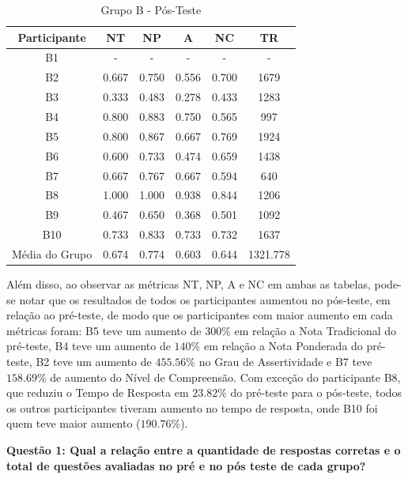 \begin{table}[htbp]
	\centering
	\caption{Grupo B - Pós-Teste}		
	\begin{tabular}{|c|c|c|c|c|c|}
		\hline
		\rowcolor[HTML]{C0C0C0} 
		\textbf{Participante} & \textbf{NT} & \textbf{NP} & \textbf{A} & \textbf{NC} & \textbf{TR} \\ \hline
		B1 & - & - & - & - & - \\ \hline
		\rowcolor[HTML]{EFEFEF} 
		B2 & 0.667 & 0.750 & 0.556 & 0.700 & 1679 \\ \hline
		B3 & 0.333 & 0.483 & 0.278 & 0.433 & 1283 \\ \hline
		\rowcolor[HTML]{EFEFEF} 
		B4 & 0.800 & 0.883 & 0.750 & 0.565 & 997 \\ \hline
		B5 & 0.800 & 0.867 & 0.667 & 0.769 & 1924 \\ \hline
		\rowcolor[HTML]{EFEFEF} 
		B6 & 0.600 & 0.733 & 0.474 & 0.659 & 1438 \\ \hline
		B7 & 0.667 & 0.767 & 0.667 & 0.594 & 640 \\ \hline
		\rowcolor[HTML]{EFEFEF} 
		B8 & 1.000 & 1.000 & 0.938 & 0.844 & 1206 \\ \hline
		B9 & 0.467 & 0.650 & 0.368 & 0.501 & 1092 \\ \hline
		\rowcolor[HTML]{EFEFEF} 
		B10 & 0.733 & 0.833 & 0.733 & 0.732 & 1637 \\ \hline
		Média do Grupo & 0.674 & 0.774 & 0.603 & 0.644 & 1321.778 \\ \hline
	\end{tabular}
	\label{tab:F1_A01-posteste}
\end{table}

Além disso, ao observar as métricas NT, NP, A e NC em ambas as tabelas, pode-se notar que os resultados de todos os participantes aumentou no pós-teste, em relação ao pré-teste, de modo que os participantes com maior aumento em cada métricas foram: B5 teve um aumento de $300\%$ em relação a Nota Tradicional do pré-teste, B4 teve um aumento de $140\%$ em relação a Nota Ponderada do pré-teste, B2 teve um aumento de $455.56\%$ no Grau de Assertividade e B7 teve $158.69\%$ de aumento do Nível de Compreensão. Com exceção do participante B8, que reduziu o Tempo de Resposta em $23.82\%$ do pré-teste para o pós-teste, todos os outros participantes tiveram aumento no tempo de resposta, onde B10 foi quem teve maior aumento ($190.76\%$).

\textbf{Questão 1: Qual a relação entre a quantidade de respostas corretas e o total de questões avaliadas no pré e no pós teste de cada grupo?}

